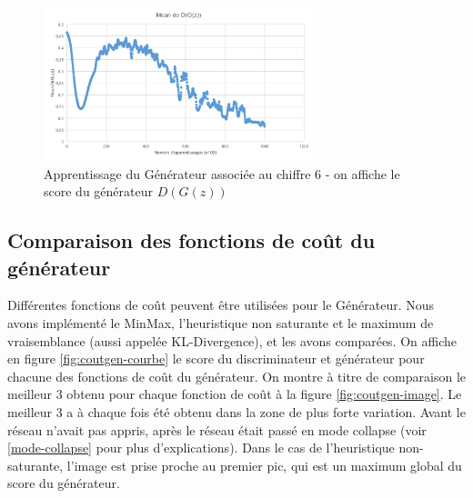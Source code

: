 \begin{figure}[ht!]
\begin{center}
\includegraphics[width=0.7\textwidth]{images/18_01_17-GAN/courbe.png}\caption{Apprentissage du Générateur associée au chiffre 6 - on affiche le score du générateur $D(G(z))$}
\end{center}
\end{figure}

\subsection{Comparaison des fonctions de coût du générateur}
Différentes fonctions de coût peuvent être utilisées pour le Générateur. Nous avons implémenté le MinMax, l'heuristique non saturante et le maximum de vraisemblance (aussi appelée KL-Divergence), et les avons comparées. On affiche en figure \ref{fig:coutgen-courbe} le score du discriminateur et générateur pour chacune des fonctions de coût du générateur. On montre à titre de comparaison le meilleur 3 obtenu pour chaque fonction de coût à la figure \ref{fig:coutgen-image}. Le meilleur 3 a à chaque fois été obtenu dans la zone de plus forte variation. Avant le réseau n'avait pas appris, après le réseau était passé en mode collapse (voir \ref{mode-collapse} pour plus d'explications). Dans le cas de l'heuristique non-saturante, l'image est prise proche au premier pic, qui est un maximum global du score du générateur.

